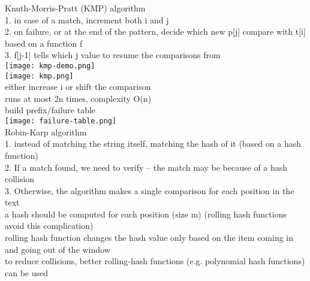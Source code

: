 \scriptsize{Knuth-Morris-Pratt (KMP) algorithm}\\ {\tiny 1. in case of a match, increment both i and j\\
2. on failure, or at the end of the pattern, decide which new p[j] compare with t[i] based on a function f\\
3. f[j-1] tells which j value to resume the comparisons from\\
\texttt{[image: kmp-demo.png]}\\
\texttt{[image: kmp.png]}\\
either increase i or shift the comparison\\
runs at most 2n times, complexity O(n)\\
build prefix/failure table\\
\texttt{[image: failure-table.png]}
}\\
\scriptsize{Robin-Karp algorithm}\\ {\tiny 1. instead of matching the string itself, matching the hash of it (based on a hash function)\\
2. If a match found, we need to verify – the match may be because of a hash collision\\
3. Otherwise, the algorithm makes a single comparison for each position in the text\\
a hash should be computed for each position (size m) (rolling hash functions avoid this complication)
}\\
\scriptsize{rolling hash function} {\tiny changes the hash value only based on the item coming in and going out of the window\\
to reduce collisions, better rolling-hash functions (e.g. polynomial hash functions) can be used
}